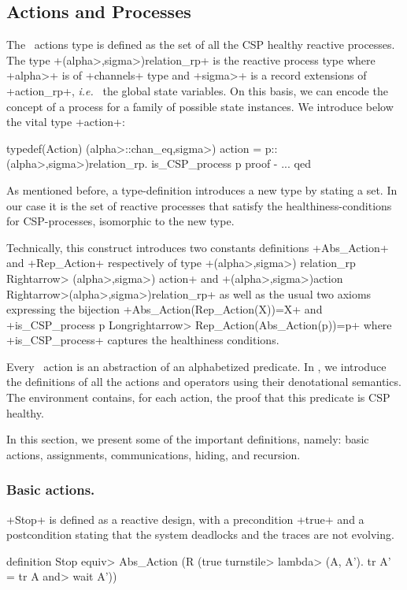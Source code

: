 \documentclass[11pt,a4paper]{article}
\newcommand{\ie}{\textit{i.e.}\ }
\begin{document}
\subsection{Actions and Processes}
\label{ActionsAndP}
The \Circus\ actions type is defined as the set of all the CSP healthy reactive processes. 
The type \inlineisar+(\<alpha>,\<sigma>)relation_rp+ is the reactive process type where 
\inlineisar+\<alpha>+ is of \inlineisar+channels+ type and 
\inlineisar+\<sigma>+ is a record extensions of \inlineisar+action_rp+, \ie{} the global state variables.
On this basis, we can encode the concept of a process for a family of possible state instances.
We introduce below the vital type \inlineisar+action+:
\begin{isar}
typedef(Action)
 (\<alpha>::chan_eq,\<sigma>) action = {p::(\<alpha>,\<sigma>)relation_rp. is_CSP_process p}
proof - {...} 
qed
\end{isar}
As mentioned before, a type-definition introduces a new type by stating a set. In our case it is the set
of reactive processes that satisfy the healthiness-conditions for CSP-processes, isomorphic to the new type.

Technically, this %
construct introduces two constants definitions \inlineisar+Abs_Action+ and \inlineisar+Rep_Action+ respectively of type  \inlineisar+(\<alpha>,\<sigma>) relation_rp \<Rightarrow> (\<alpha>,\<sigma>) action+ and
\inlineisar+(\<alpha>,\<sigma>)action \<Rightarrow>(\<alpha>,\<sigma>)relation_rp+ as well as the
usual two axioms expressing the bijection \inlineisar+Abs_Action(Rep_Action(X))=X+ and 
\inlineisar+is_CSP_process p \<Longrightarrow> Rep_Action(Abs_Action(p))=p+ where
\inlineisar+is_CSP_process+ captures the healthiness conditions. 

Every \Circus\ action is an abstraction of an alphabetized predicate. In \cite{fgw11rapport-lri}, we introduce the definitions of all the actions 
and operators using their denotational semantics. The environment contains, for each action, the proof that this predicate 
is CSP healthy.

In this section, we present some of the important definitions, namely: basic actions, assignments, communications, hiding, and recursion.

\subsubsection{Basic actions.}
\inlineisar+Stop+ is defined as a reactive design, with a precondition \inlineisar+true+ and
a postcondition stating that the system deadlocks and the traces are 
not evolving.
\begin{isar}
definition 
Stop \<equiv>   Abs_Action (R (true \<turnstile> \<lambda> (A, A'). tr A' = tr A \<and>    wait A'))
\end{isar}
\end{document}
